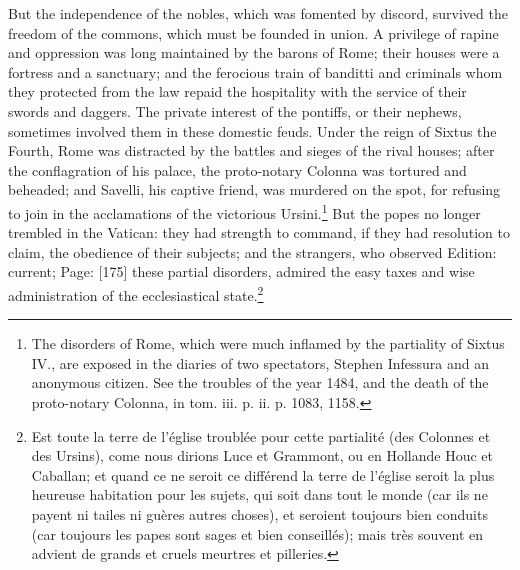 But the independence of the nobles, which was fomented by discord, survived the freedom of the commons, which must be founded in union. A privilege of rapine and oppression was long maintained by the barons of Rome; their houses were a fortress and a sanctuary; and the ferocious train of banditti and criminals whom they protected from the law repaid the hospitality with the service of their swords and daggers. The private interest of the pontiffs, or their nephews, sometimes involved them in these domestic feuds. Under the reign of Sixtus the Fourth, Rome was distracted by the battles and sieges of the rival houses; after the conflagration of his palace, the proto-notary Colonna was tortured and beheaded; and Savelli, his captive friend, was murdered on the spot, for refusing to join in the acclamations of the victorious Ursini.\footnote{The disorders of Rome, which were much inflamed by the partiality of Sixtus IV., are exposed in the diaries of two spectators, Stephen Infessura and an anonymous citizen. See the troubles of the year 1484, and the death of the proto-notary Colonna, in tom. iii. p. ii. p. 1083, 1158.} But the popes no longer trembled in the Vatican: they had strength to command, if they had resolution to claim, the obedience of their subjects; and the strangers, who observed Edition: current; Page: [175] these partial disorders, admired the easy taxes and wise administration of the ecclesiastical state.\footnote{Est toute la terre de l\texthebrew{}’église troublée pour cette partialité (des Colonnes et des Ursins), come nous dirions Luce et Grammont, ou en Hollande Houc et Caballan; et quand ce ne seroit ce différend la terre de l\texthebrew{}’église seroit la plus heureuse habitation pour les sujets, qui soit dans tout le monde (car ils ne payent ni tailes ni guères autres choses), et seroient toujours bien conduits (car toujours les papes sont sages et bien conseillés); mais très souvent en advient de grands et cruels meurtres et pilleries.}

